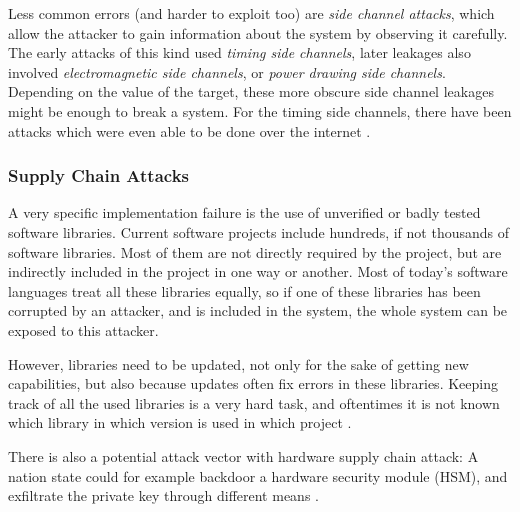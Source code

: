 Less common errors (and harder to exploit too) are \emph{side channel attacks}, which allow the attacker to gain
information about the system by observing it carefully.
The early attacks of this kind used \emph{timing side channels}, later leakages also
involved \emph{electromagnetic side channels}, or \emph{power drawing side channels}.
Depending on the value of the target, these more obscure side channel leakages might 
be enough to break a system.
For the timing side channels, there have been attacks which were even able to be done
over the internet \cite{BB03}.

\subsubsection{Supply Chain Attacks}

A very specific implementation failure is the use of unverified or badly tested
software libraries.
Current software projects include hundreds, if not thousands of software libraries.
Most of them are not directly required by the project, but are indirectly included
in the project in one way or another.
Most of today's software languages treat all these libraries equally, so if one of
these libraries has been corrupted by an attacker, and is included in the system,
the whole system can be exposed to this attacker.

However, libraries need to be updated, not only for the sake of getting new capabilities,
but also because updates often fix errors in these libraries.
Keeping track of all the used libraries is a very hard task, and oftentimes it is not
known which library in which version is used in which project \cite{Log4Shell21}.

There is also a potential attack vector with hardware supply chain attack:
A nation state could for example backdoor a hardware security module (HSM), 
and exfiltrate the private key through different means \cite{SchneierBackdoor25}.
